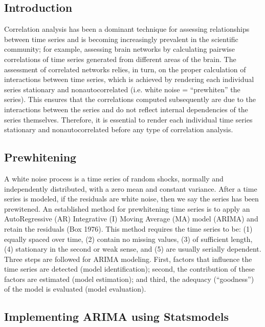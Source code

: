 \documentclass[letterpaper,compsoc,twoside]{IEEEtran}
\begin{document}
\subsection{Introduction%
  \label{introduction}%
}


Correlation analysis has been a dominant technique for assessing relationships between time series and is becoming increasingly prevalent in the scientific community; for example, assessing brain networks by calculating pairwise correlations of time series generated from different areas of the brain. The assessment of correlated networks relies, in turn, on the proper calculation of interactions between time series, which is achieved by rendering each individual series stationary and nonautocorrelated (i.e. white noise = “prewhiten” the series). This ensures that the correlations computed subsequently are due to the interactions between the series and do not reflect internal dependencies of the series themselves. Therefore, it is essential to render each individual time series stationary and nonautocorrelated before any type of correlation analysis.

\subsection{Prewhitening%
  \label{prewhitening}%
}


A white noise process is a time series of random shocks, normally and independently distributed, with a zero mean and constant variance. After a time series is modeled, if the residuals are white noise, then we say the series has been prewitened. An established method for prewhitening time series is to apply an AutoRegressive (AR) Integrative (I) Moving Average (MA) model (ARIMA) and retain the residuals (Box 1976). This method requires the time series to be: (1) equally spaced over time, (2) contain no missing values, (3) of sufficient length, (4) stationary in the second or weak sense, and (5) are usually serially dependent.
Three steps are followed for ARIMA modeling. First, factors that influence the time series are detected (model identification); second, the contribution of these factors are estimated (model estimation); and third, the adequacy (“goodness”) of the model is evaluated (model evaluation).

\subsection{Implementing ARIMA using Statsmodels%
  \label{implementing-arima-using-statsmodels}%
}
\end{document}
